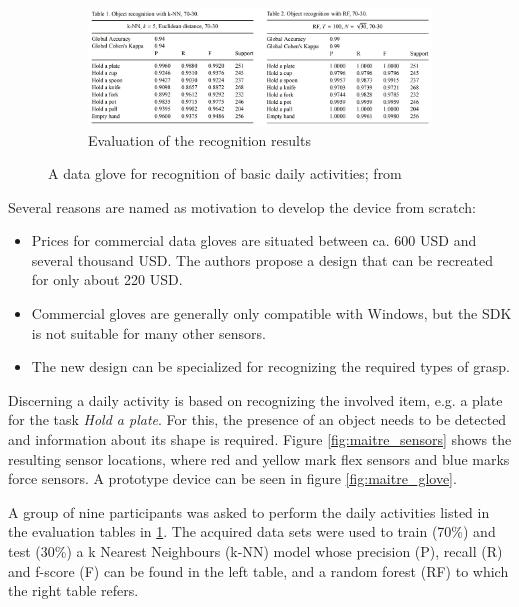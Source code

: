 \documentclass[hyperref, bachelorofscience]{cgvpub}
\begin{document}
\begin{figure}
	\vspace{.5cm}
	\begin{subfigure}{\linewidth}
		\includegraphics[width=\linewidth]{../pics/maitre_results}
		\caption{Evaluation of the recognition results}
		\label{fig:maitre_results}
	\end{subfigure}
	\caption[A data glove for recognition of basic daily activities]{A data glove for recognition of basic daily activities; from \cite{maitre19}}
	\label{fig:maitre}
\end{figure}

Several reasons are named as motivation to develop the device from scratch:
\vspace{.3cm}
\begin{itemize}
	\item Prices for commercial data gloves are situated between ca. 600 USD and several thousand USD. The authors propose a design that can be recreated for only about 220 USD.
	\item Commercial gloves are generally only compatible with Windows, but the SDK is not suitable for many other sensors.
	\item The new design can be specialized for recognizing the required types of grasp.
\end{itemize}

Discerning a daily activity is based on recognizing the involved item, e.g. a plate for the task \emph{Hold a plate}. For this, the presence of an object needs to be detected and information about its shape is required. Figure \ref{fig:maitre_sensors} shows the resulting sensor locations, where red and yellow mark flex sensors and blue marks force sensors. A prototype device can be seen in figure \ref{fig:maitre_glove}. 

A group of nine participants was asked to perform the daily activities listed in the evaluation tables in \ref{fig:maitre_results}. The acquired data sets were used to train (70\%) and test (30\%) a k Nearest Neighbours (k-NN) model whose precision (P), recall (R) and f-score (F) can be found in the left table, and a random forest (RF) to which the right table refers.
\end{document}
